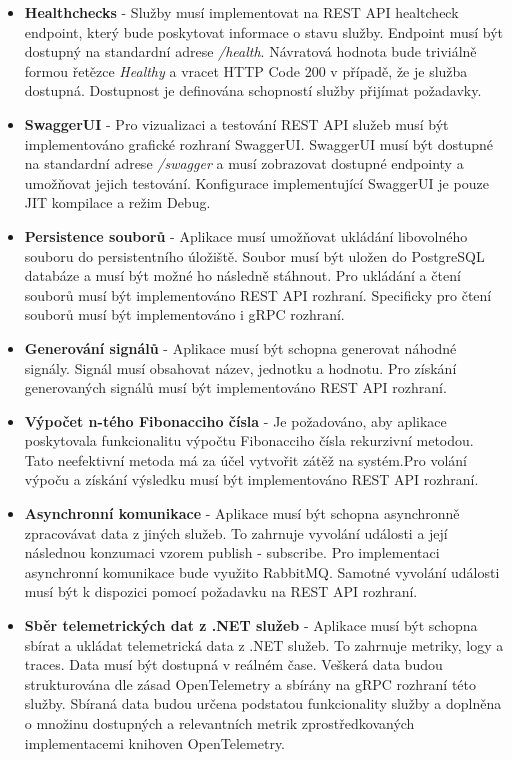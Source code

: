 \begin{itemize}
  \item \textbf{Healthchecks} - Služby musí implementovat na REST API healtcheck endpoint, který bude poskytovat informace o stavu služby. Endpoint musí být dostupný na standardní adrese \emph{/health}. Návratová hodnota bude triviálně formou řetězce \emph{Healthy} a vracet HTTP Code 200 v případě, že je služba dostupná. Dostupnost je definována schopností služby přijímat požadavky.
  \item \textbf{SwaggerUI} - Pro vizualizaci a testování REST API služeb musí být implementováno grafické rozhraní SwaggerUI. SwaggerUI musí být dostupné na standardní adrese \emph{/swagger} a musí zobrazovat dostupné endpointy a umožňovat jejich testování. Konfigurace implementující SwaggerUI je pouze JIT kompilace a režim Debug.
  \item \textbf{Persistence souborů} - Aplikace musí umožňovat ukládání libovolného souboru do persistentního úložiště. Soubor musí být uložen do PostgreSQL databáze a musí být možné ho následně stáhnout. Pro ukládání a čtení souborů musí být implementováno REST API rozhraní. Specificky pro čtení souborů musí být implementováno i gRPC rozhraní.
  \item \textbf{Generování signálů} - Aplikace musí být schopna generovat náhodné signály. Signál musí obsahovat název, jednotku a hodnotu. Pro získání generovaných signálů musí být implementováno REST API rozhraní.
  \item \textbf{Výpočet n-tého Fibonacciho čísla} - Je požadováno, aby aplikace poskytovala funkcionalitu výpočtu Fibonacciho čísla rekurzivní metodou. Tato neefektivní metoda má za účel vytvořit zátěž na systém.Pro volání výpoču a získání výsledku musí být implementováno REST API rozhraní.
  \item \textbf{Asynchronní komunikace} - Aplikace musí být schopna asynchronně zpracovávat data z jiných služeb. To zahrnuje vyvolání události a její následnou konzumaci vzorem publish - subscribe. Pro implementaci asynchronní komunikace bude využito RabbitMQ. Samotné vyvolání události musí být k dispozici pomocí požadavku na REST API rozhraní.
  \item \textbf{Sběr telemetrických dat z .NET služeb} - Aplikace musí být schopna sbírat a ukládat telemetrická data z .NET služeb. To zahrnuje metriky, logy a traces. Data musí být dostupná v reálném čase. Veškerá data budou strukturována dle zásad OpenTelemetry a sbírány na gRPC rozhraní této služby. Sbíraná data budou určena podstatou funkcionality služby a doplněna o množinu dostupných a relevantních metrik zprostředkovaných implementacemi knihoven OpenTelemetry.

\end{itemize}
